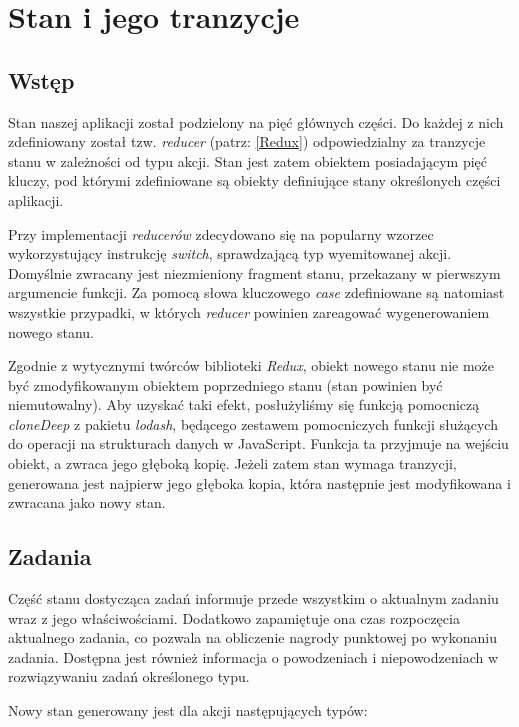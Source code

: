 \documentclass[12pt,a4paper,polish,thesis]{dcsbook}
\begin{document}
{	\section{Stan i jego tranzycje}
	
	\subsection{Wstęp}
	
	Stan naszej aplikacji został podzielony na pięć głównych części. Do każdej z nich zdefiniowany został tzw. \textit{reducer} (patrz: \ref{Redux}) odpowiedzialny za tranzycje stanu w zależności od typu akcji. Stan jest zatem obiektem posiadającym pięć kluczy, pod którymi zdefiniowane są obiekty definiujące stany określonych części aplikacji.
	
	Przy implementacji \textit{reducerów} zdecydowano się na popularny wzorzec wykorzystujący instrukcję \textit{switch}, sprawdzającą typ wyemitowanej akcji. Domyślnie zwracany jest niezmieniony fragment stanu, przekazany w pierwszym argumencie funkcji. Za pomocą słowa kluczowego \textit{case} zdefiniowane są natomiast wszystkie przypadki, w których \textit{reducer} powinien zareagować wygenerowaniem nowego stanu.
	
	Zgodnie z wytycznymi twórców biblioteki \textit{Redux}, obiekt nowego stanu nie może być zmodyfikowanym obiektem poprzedniego stanu (stan powinien być niemutowalny). Aby uzyskać taki efekt, posłużyliśmy się funkcją pomocniczą \textit{cloneDeep} z pakietu \textit{lodash}, będącego zestawem pomocniczych funkcji służących do operacji na strukturach danych w JavaScript. Funkcja ta przyjmuje na wejściu obiekt, a zwraca jego głęboką kopię. Jeżeli zatem stan wymaga tranzycji, generowana jest najpierw jego głęboka kopia, która następnie jest modyfikowana i zwracana jako nowy stan.
	
	\subsection{Zadania}
	
	Część stanu dostycząca zadań informuje przede wszystkim o aktualnym zadaniu wraz z jego właściwościami. Dodatkowo zapamiętuje ona czas rozpoczęcia aktualnego zadania, co pozwala na obliczenie nagrody punktowej po wykonaniu zadania. Dostępna jest również informacja o powodzeniach i niepowodzeniach w rozwiązywaniu zadań określonego typu.
	
	Nowy stan generowany jest dla akcji następujących typów:
		
}
\end{document}
